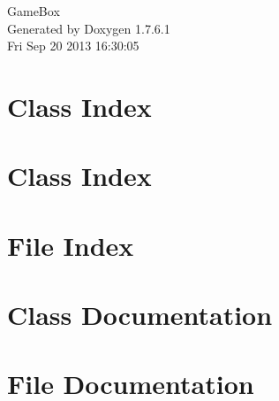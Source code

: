 \documentclass[a4paper]{book}
\begin{document}
\hypersetup{pageanchor=false,citecolor=blue}
\begin{titlepage}
\vspace*{7cm}
\begin{center}
{\Large \-Game\-Box }\\
\vspace*{1cm}
{\large \-Generated by Doxygen 1.7.6.1}\\
\vspace*{0.5cm}
{\small Fri Sep 20 2013 16:30:05}\\
\end{center}
\end{titlepage}
\clearemptydoublepage
{}
\tableofcontents
\clearemptydoublepage
{}
\hypersetup{pageanchor=true,citecolor=blue}
\chapter{\-Class \-Index}

\chapter{\-Class \-Index}

\chapter{\-File \-Index}

\chapter{\-Class \-Documentation}





















\chapter{\-File \-Documentation}

























\printindex
\end{document}
